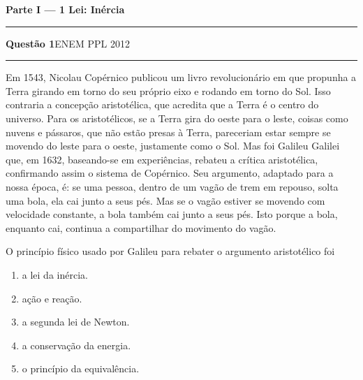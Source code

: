 \documentclass[11pt,a4paper]{article}
\newcommand{\fonte}[1]{{\small\scshape\color{grafite}#1}}
\newenvironment{questao}[2]{%
  \needspace{6\baselineskip}
  \par\addvspace{1.6em}
  {\large\bfseries\color{vinho}Quest\~ao #1}\hfill #2\\[-0.55em]
  {\color{black!25}\rule{\linewidth}{0.4pt}}
  \par\nobreak\smallskip
}{\par\addvspace{0.4em}}
\newcommand{\parte}[1]{%
  \needspace{7\baselineskip}
  \vspace{1.8em}
  {\Large\bfseries #1}\\[-0.55em]
  {\color{black!30}\rule{\linewidth}{0.5pt}}
  \par\nobreak\smallskip
}
\begin{document}
\newpage

\parte{Parte I --- 1\textordfeminine{} Lei: In\'ercia}

\begin{questao}{1}{\fonte{ENEM PPL 2012}}
Em 1543, Nicolau Cop\'ernico publicou um livro revolucion\'ario em que
propunha a Terra girando em torno do seu pr\'oprio eixo e rodando em
torno do Sol. Isso contraria a concep\c{c}\~ao aristot\'elica, que
acredita que a Terra \'e o centro do universo. Para os aristot\'elicos,
se a Terra gira do oeste para o leste, coisas como nuvens e p\'assaros,
que n\~ao est\~ao presas \`a Terra, pareceriam estar sempre se movendo
do leste para o oeste, justamente como o Sol. Mas foi Galileu Galilei
que, em 1632, baseando-se em experi\^encias, rebateu a cr\'itica
aristot\'elica, confirmando assim o sistema de Cop\'ernico. Seu
argumento, adaptado para a nossa \'epoca, \'e: se uma pessoa, dentro de
um vag\~ao de trem em repouso, solta uma bola, ela cai junto a seus
p\'es. Mas se o vag\~ao estiver se movendo com velocidade constante, a
bola tamb\'em cai junto a seus p\'es. Isto porque a bola, enquanto cai,
continua a compartilhar do movimento do vag\~ao.

O princ\'ipio f\'isico usado por Galileu para rebater o argumento
aristot\'elico foi
\begin{enumerate}
  \item a lei da in\'ercia.
  \item a\c{c}\~ao e rea\c{c}\~ao.
  \item a segunda lei de Newton.
  \item a conserva\c{c}\~ao da energia.
  \item o princ\'ipio da equival\^encia.
\end{enumerate}
\end{questao}
\end{document}
